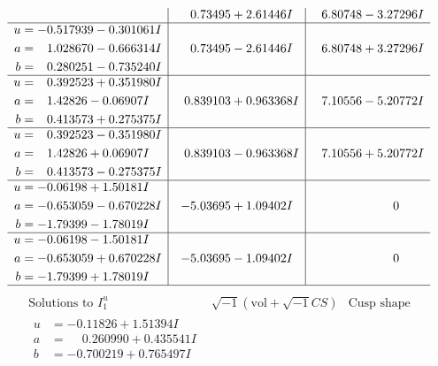 \documentclass[1p]{elsarticle_modified}
\theoremstyle{definition}
\newcommand{\I}{\sqrt{-1}}
\begin{document}
$$\begin{array}{c|c|c}
 & \phantom{-}0.73495 + 2.61446 I & \phantom{-}6.80748 - 3.27296 I \\ \hline\begin{aligned}
u &= -0.517939 - 0.301061 I \\
a &= \phantom{-}1.028670 - 0.666314 I \\
b &= \phantom{-}0.280251 - 0.735240 I\end{aligned}
 & \phantom{-}0.73495 - 2.61446 I & \phantom{-}6.80748 + 3.27296 I \\ \hline\begin{aligned}
u &= \phantom{-}0.392523 + 0.351980 I \\
a &= \phantom{-}1.42826 - 0.06907 I \\
b &= \phantom{-}0.413573 + 0.275375 I\end{aligned}
 & \phantom{-}0.839103 + 0.963368 I & \phantom{-}7.10556 - 5.20772 I \\ \hline\begin{aligned}
u &= \phantom{-}0.392523 - 0.351980 I \\
a &= \phantom{-}1.42826 + 0.06907 I \\
b &= \phantom{-}0.413573 - 0.275375 I\end{aligned}
 & \phantom{-}0.839103 - 0.963368 I & \phantom{-}7.10556 + 5.20772 I \\ \hline\begin{aligned}
u &= -0.06198 + 1.50181 I \\
a &= -0.653059 - 0.670228 I \\
b &= -1.79399 - 1.78019 I\end{aligned}
 & -5.03695 + 1.09402 I & \phantom{-0.000000 } 0 \\ \hline\begin{aligned}
u &= -0.06198 - 1.50181 I \\
a &= -0.653059 + 0.670228 I \\
b &= -1.79399 + 1.78019 I\end{aligned}
 & -5.03695 - 1.09402 I & \phantom{-0.000000 } 0\\
 \hline 
 \end{array}$$\newpage$$\begin{array}{c|c|c}  
\text{Solutions to }I^u_{1}& \I (\text{vol} + \sqrt{-1}CS) & \text{Cusp shape}\\
 \hline 
\begin{aligned}
u &= -0.11826 + 1.51394 I \\
a &= \phantom{-}0.260990 + 0.435541 I \\
b &= -0.700219 + 0.765497 I\end{aligned}

\end{array}$$
\end{document}
